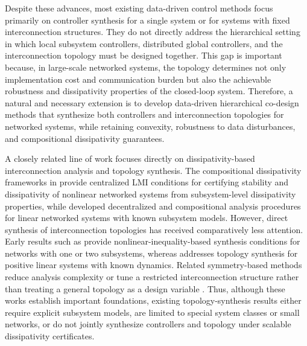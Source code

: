 \documentclass[letterpaper, 10 pt, conference]{ieeeconf}%
\newcommand{\0}{\mathbf{0}}
\begin{document}
Despite these advances, most existing data-driven control methods focus primarily on controller synthesis for a single system or for systems with fixed interconnection structures. They do not directly address the hierarchical setting in which local subsystem controllers, distributed global controllers, and the interconnection topology must be designed together. This gap is important because, in large-scale networked systems, the topology determines not only implementation cost and communication burden but also the achievable robustness and dissipativity properties of the closed-loop system. Therefore, a natural and necessary extension is to develop data-driven hierarchical co-design methods that synthesize both controllers and interconnection topologies for networked systems, while retaining convexity, robustness to data disturbances, and compositional dissipativity guarantees.

A closely related line of work focuses directly on dissipativity-based interconnection analysis and topology synthesis. The compositional dissipativity frameworks in \cite{Arcak2016,Arcak2022} provide centralized LMI conditions for certifying stability and dissipativity of nonlinear networked systems from subsystem-level dissipativity properties, while \cite{Agarwal2021,WelikalaP32022} developed decentralized and compositional analysis procedures for linear networked systems with known subsystem models. However, direct synthesis of interconnection topologies has received comparatively less attention. Early results such as \cite{Xia2014,Xia2018} provide nonlinear-inequality-based synthesis conditions for networks with one or two subsystems, whereas \cite{Ebihara2017} addresses topology synthesis for positive linear systems with known dynamics. Related symmetry-based methods reduce analysis complexity or tune a restricted interconnection structure rather than treating a general topology as a design variable \cite{Rufino2018,Ghanbari2016,Goodwine2013}. Thus, although these works establish important foundations, existing topology-synthesis results either require explicit subsystem models, are limited to special system classes or small networks, or do not jointly synthesize controllers and topology under scalable dissipativity certificates.
\end{document}
